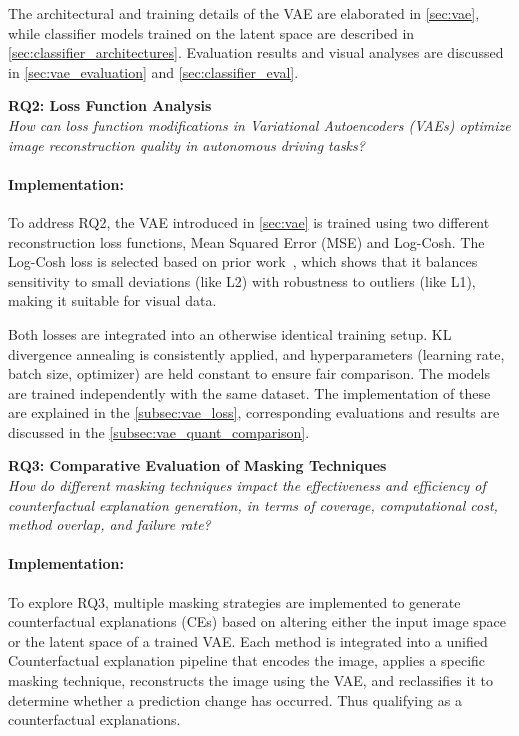 The architectural and training details of the VAE are elaborated in \cref{sec:vae}, while classifier models trained on the latent space are described in \cref{sec:classifier_architectures}. Evaluation results and visual analyses are discussed in \cref{sec:vae_evaluation} and \cref{sec:classifier_eval}.

\vspace{1em}

\textbf{RQ2: Loss Function Analysis} \\
\textit{How can loss function modifications in Variational Autoencoders (VAEs) optimize image reconstruction quality in autonomous driving tasks?}

\vspace{-1em}

\paragraph{Implementation:} To address RQ2, the VAE introduced in \cref{sec:vae} is trained using two different reconstruction loss functions, Mean Squared Error (MSE) and Log-Cosh. The Log-Cosh loss is selected based on prior work~\cite{chen2019log}, which shows that it balances sensitivity to small deviations (like L2) with robustness to outliers (like L1), making it suitable for visual data.
        
Both losses are integrated into an otherwise identical training setup. KL divergence annealing is consistently applied, and hyperparameters (learning rate, batch size, optimizer) are held constant to ensure fair comparison. The models are trained independently with the same dataset. The implementation of these are explained in the \cref{subsec:vae_loss}, corresponding evaluations and results are discussed in the \cref{subsec:vae_quant_comparison}.


\vspace{1em}

\textbf{RQ3: Comparative Evaluation of Masking Techniques} \\
\textit{How do different masking techniques impact the effectiveness and efficiency of counterfactual explanation generation, in terms of coverage, computational cost, method overlap, and failure rate?}

\vspace{-1em}

\paragraph{Implementation:}To explore RQ3, multiple masking strategies are implemented to generate counterfactual explanations (CEs) based on altering either the input image space or the latent space of a trained VAE. Each method is integrated into a unified Counterfactual explanation pipeline that encodes the image, applies a specific masking technique, reconstructs the image using the VAE, and reclassifies it to determine whether a prediction change has occurred. Thus qualifying as a counterfactual explanations.


